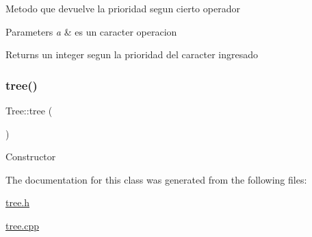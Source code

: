 Metodo que devuelve la prioridad segun cierto operador 
\begin{DoxyParams}{Parameters}
{\em a} & es un caracter operacion \\
\hline
\end{DoxyParams}
\begin{DoxyReturn}{Returns}
un integer segun la prioridad del caracter ingresado 
\end{DoxyReturn}
\hypertarget{class_tree_a7bebcbdd3651d31b2adeb82e8817a720}{}\label{class_tree_a7bebcbdd3651d31b2adeb82e8817a720} 
\subsubsection{\texorpdfstring{tree()}{tree()}}
{\footnotesize\ttfamily Tree\+::tree (\begin{DoxyParamCaption}{ }\end{DoxyParamCaption})}

Constructor 

The documentation for this class was generated from the following files\+:\begin{DoxyCompactItemize}
\item 
\hyperlink{tree_8h}{tree.\+h}\item 
\hyperlink{tree_8cpp}{tree.\+cpp}\end{DoxyCompactItemize}
